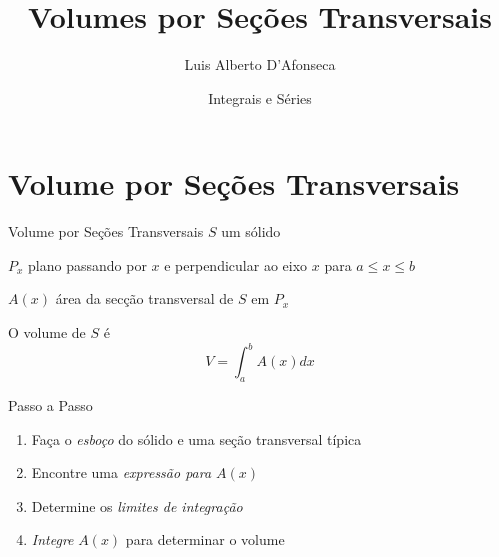 
\usepackage{apresentacao}
\usepackage{mathconfig}
\usepackage{tabto}

\makeatletter
\graphicspath  {{./figs/}}
\makeatother

\title {Volumes por Seções Transversais}
\author{\large Luis Alberto D'Afonseca}
\date  {Integrais e Séries}



\begin{frame}
    \titlepage
\end{frame}

\section{Volume por Seções Transversais}


\begin{frame}{Volume por Seções Transversais}
  \emph{$S$}    \tabto{10mm} um sólido

  \pause
  \vspace{\baselineskip}
  \emph{$P_x$}  \tabto{10mm} plano passando por $x$ e perpendicular ao
                             eixo $x$ para $a \leq x \leq b$

  \pause
  \vspace{\baselineskip}
  \emph{$A(x)$} \tabto{10mm} área da secção transversal de $S$ em $P_x$

  \pause
  \vspace{\baselineskip}
  O volume de $S$ é
  \[
    V = \int_a^b A(x)dx
  \]
\end{frame}

\begin{frame}{Passo a Passo}
\begin{enumerate}[<+->]
  \setlength\itemsep{1em}
  \item Faça o \emph{esboço} do sólido e uma seção transversal típica
  \item Encontre uma \emph{expressão para $A(x)$}
  \item Determine os \emph{limites de integração}
  \item \emph{Integre} $A(x)$ para determinar o volume
\end{enumerate}
\end{frame}

